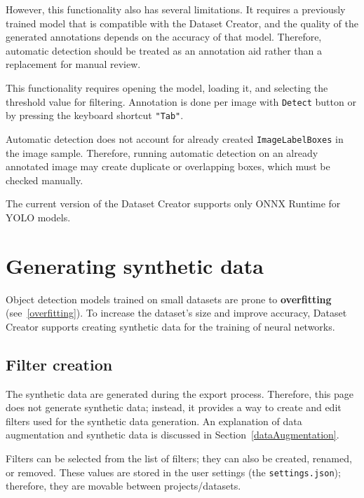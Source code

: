 However, this functionality also has several limitations. It requires a previously trained model that is compatible with the Dataset Creator, and the quality of the generated annotations depends on the accuracy of that model. Therefore, automatic detection should be treated as an annotation aid rather than a replacement for manual review.

This functionality requires opening the model, loading it, and selecting the threshold value for filtering. Annotation is done per image with \texttt{Detect} button or by pressing the keyboard shortcut \texttt{"Tab"}. 

Automatic detection does not account for already created \texttt{ImageLabelBoxes} in the image sample. Therefore, running automatic detection on an already annotated image may create duplicate or overlapping boxes, which must be checked manually.

The current version of the Dataset Creator supports only ONNX Runtime for YOLO models.



\section{Generating synthetic data}
Object detection models trained on small datasets are prone to \textbf{overfitting} (see~\ref{overfitting}). To increase the dataset's size and improve accuracy, Dataset Creator supports creating synthetic data for the training of neural networks.

\subsection{Filter creation}
The synthetic data are generated during the export process. Therefore, this page does not generate synthetic data; instead, it provides a way to create and edit filters used for the synthetic data generation. An explanation of data augmentation and synthetic data is discussed in Section~\ref{dataAugmentation}. 

Filters can be selected from the list of filters; they can also be created, renamed, or removed. These values are stored in the user settings (the \texttt{settings.json}); therefore, they are movable between projects/datasets.

